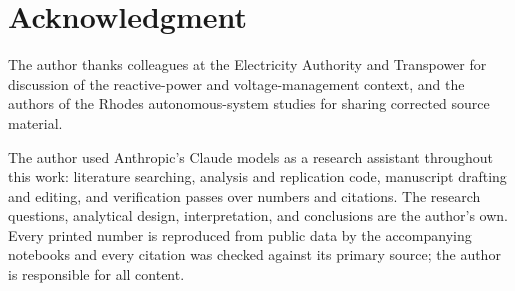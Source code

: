 \documentclass[journal]{IEEEtran}
\begin{document}
\section*{Acknowledgment}
The author thanks colleagues at the Electricity Authority and Transpower for
discussion of the reactive-power and voltage-management context, and the authors of
the Rhodes autonomous-system studies for sharing corrected source material.

The author used Anthropic's Claude models as a research assistant throughout this
work: literature searching, analysis and replication code, manuscript drafting and
editing, and verification passes over numbers and citations. The research questions,
analytical design, interpretation, and conclusions are the author's own. Every
printed number is reproduced from public data by the accompanying notebooks and
every citation was checked against its primary source; the author is responsible for
all content.



\end{document}

